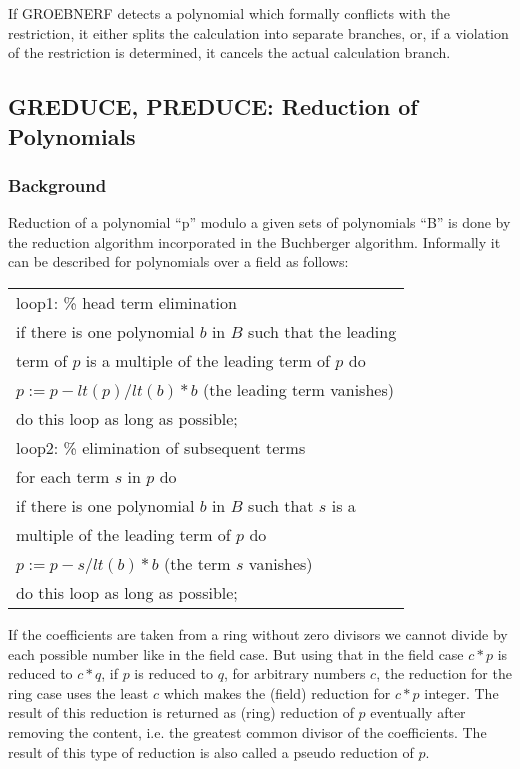 If GROEBNERF detects a polynomial which formally conflicts with the
restriction, it either splits the calculation into separate branches, or,
if a violation of the restriction is determined, it cancels the actual
calculation branch.

\subsection{GREDUCE, PREDUCE: Reduction of Polynomials}

\subsubsection{Background} \label{GROEBNER:background}
Reduction of a polynomial ``p'' modulo a given sets of polynomials
``B'' is done by the reduction algorithm incorporated in the
Buchberger algorithm. Informally it can be described for
polynomials over a field as follows:
\begin{center}
\begin{tabular}{l}
loop1: \hspace*{2mm}\% head term elimination \\
\hspace*{-1cm} if there is one polynomial $b$ in $B$ such that the
leading \\ term of $p$ is a multiple of the leading term of $p$ do \\
$p := p - lt(p)/lt(b) * b$  (the leading term vanishes)\\
\hspace*{-1cm} do this loop as long as possible; \\
loop2: \hspace*{2mm} \% elimination of subsequent terms \\
\hspace*{-1cm} for each term $s$ in $p$ do \\
if there is one polynomial $b$ in $B$ such that $s$ is a\\
multiple of the leading term of $p$ do \\
$p := p - s/lt(b) * b$ (the term $s$ vanishes) \\
\hspace*{-1cm}do this loop as long as possible;
\end{tabular}
\end{center}

If the coefficients are taken from a ring without zero divisors we
cannot divide by each possible number like in the field case. But
using that in the field case  $c*p $ is reduced to  $c*q $, if $ p $
is reduced to $ q $, for arbitrary numbers $ c $,  the reduction for
the ring case uses the least $ c $ which makes the (field) reduction
for $ c*p $ integer. The result of this reduction is returned as
(ring) reduction of $ p $ eventually after removing the content, i.e.
the greatest common divisor of the coefficients. The result of this
type of reduction is also called a pseudo reduction of $ p $.



